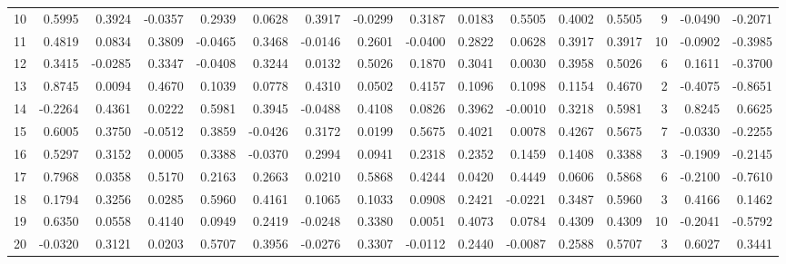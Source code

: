 \begin{tabular}{lrrrrrrrrrrrrrrr}
10  &      0.5995 &  0.3924 & -0.0357 &  0.2939 &  0.0628 &  0.3917 & -0.0299 &  0.3187 &  0.0183 &  0.5505 &   0.4002 &     0.5505 &      9 &                   -0.0490 &                    -0.2071 \\
11  &      0.4819 &  0.0834 &  0.3809 & -0.0465 &  0.3468 & -0.0146 &  0.2601 & -0.0400 &  0.2822 &  0.0628 &   0.3917 &     0.3917 &     10 &                   -0.0902 &                    -0.3985 \\
12  &      0.3415 & -0.0285 &  0.3347 & -0.0408 &  0.3244 &  0.0132 &  0.5026 &  0.1870 &  0.3041 &  0.0030 &   0.3958 &     0.5026 &      6 &                    0.1611 &                    -0.3700 \\
13  &      0.8745 &  0.0094 &  0.4670 &  0.1039 &  0.0778 &  0.4310 &  0.0502 &  0.4157 &  0.1096 &  0.1098 &   0.1154 &     0.4670 &      2 &                   -0.4075 &                    -0.8651 \\
14  &     -0.2264 &  0.4361 &  0.0222 &  0.5981 &  0.3945 & -0.0488 &  0.4108 &  0.0826 &  0.3962 & -0.0010 &   0.3218 &     0.5981 &      3 &                    0.8245 &                     0.6625 \\
15  &      0.6005 &  0.3750 & -0.0512 &  0.3859 & -0.0426 &  0.3172 &  0.0199 &  0.5675 &  0.4021 &  0.0078 &   0.4267 &     0.5675 &      7 &                   -0.0330 &                    -0.2255 \\
16  &      0.5297 &  0.3152 &  0.0005 &  0.3388 & -0.0370 &  0.2994 &  0.0941 &  0.2318 &  0.2352 &  0.1459 &   0.1408 &     0.3388 &      3 &                   -0.1909 &                    -0.2145 \\
17  &      0.7968 &  0.0358 &  0.5170 &  0.2163 &  0.2663 &  0.0210 &  0.5868 &  0.4244 &  0.0420 &  0.4449 &   0.0606 &     0.5868 &      6 &                   -0.2100 &                    -0.7610 \\
18  &      0.1794 &  0.3256 &  0.0285 &  0.5960 &  0.4161 &  0.1065 &  0.1033 &  0.0908 &  0.2421 & -0.0221 &   0.3487 &     0.5960 &      3 &                    0.4166 &                     0.1462 \\
19  &      0.6350 &  0.0558 &  0.4140 &  0.0949 &  0.2419 & -0.0248 &  0.3380 &  0.0051 &  0.4073 &  0.0784 &   0.4309 &     0.4309 &     10 &                   -0.2041 &                    -0.5792 \\
20  &     -0.0320 &  0.3121 &  0.0203 &  0.5707 &  0.3956 & -0.0276 &  0.3307 & -0.0112 &  0.2440 & -0.0087 &   0.2588 &     0.5707 &      3 &                    0.6027 &                     0.3441 \\

\end{tabular}
